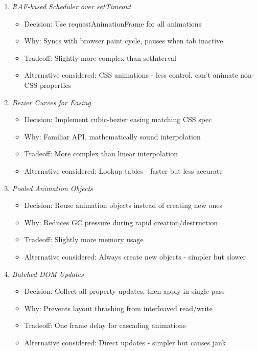 \documentclass[11pt]{article}
\begin{document}
\begin{enumerate}
\item \emph{RAF-based Scheduler over setTimeout}

\begin{itemize}
\item Decision: Use requestAnimationFrame for all animations
\item Why: Syncs with browser paint cycle, pauses when tab inactive
\item Tradeoff: Slightly more complex than setInterval
\item Alternative considered: CSS animations - less control, can't animate non-CSS properties
\end{itemize}

\item \emph{Bezier Curves for Easing}

\begin{itemize}
\item Decision: Implement cubic-bezier easing matching CSS spec
\item Why: Familiar API, mathematically sound interpolation
\item Tradeoff: More complex than linear interpolation
\item Alternative considered: Lookup tables - faster but less accurate
\end{itemize}

\item \emph{Pooled Animation Objects}

\begin{itemize}
\item Decision: Reuse animation objects instead of creating new ones
\item Why: Reduces GC pressure during rapid creation/destruction
\item Tradeoff: Slightly more memory usage
\item Alternative considered: Always create new objects - simpler but slower
\end{itemize}

\item \emph{Batched DOM Updates}

\begin{itemize}
\item Decision: Collect all property updates, then apply in single pass
\item Why: Prevents layout thrashing from interleaved read/write
\item Tradeoff: One frame delay for cascading animations
\item Alternative considered: Direct updates - simpler but causes jank
\end{itemize}
\end{enumerate}
\end{document}
